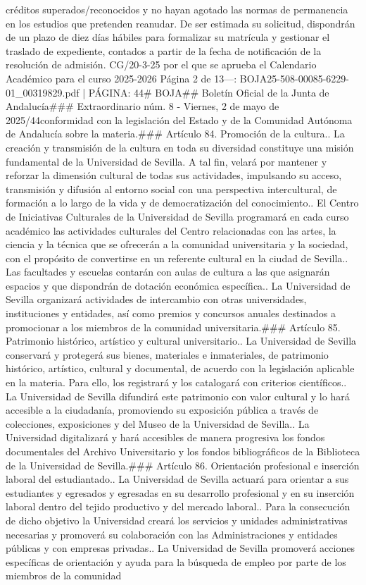 \documentclass{article}
\begin{document}
\begin{itemize}
{créditos superados/reconocidos y no hayan agotado las normas de permanencia en los estudios que pretenden reanudar. De ser estimada su solicitud, dispondrán de un plazo de diez días hábiles para formalizar su matrícula y gestionar el traslado de expediente, contados a partir de la fecha de notificación de la resolución de admisión.\n{} CG/20-3-25 por el que se aprueba el Calendario Académico para el curso 2025-2026  Página 2 de 13\n\n---\n\nFUENTE: BOJA25-508-00085-6229-01_00319829.pdf | PÁGINA: 44\n# BOJA\n## Boletín Oficial de la Junta de Andalucía\n### Extraordinario núm. 8 - Viernes, 2 de mayo de 2025/44\n\nde conformidad con la legislación del Estado y de la Comunidad Autónoma de Andalucía sobre la materia.\n\n### Artículo 84. Promoción de la cultura.. La creación y transmisión de la cultura en toda su diversidad constituye una misión fundamental de la Universidad de Sevilla. A tal fin, velará por mantener y reforzar la dimensión cultural de todas sus actividades, impulsando su acceso, transmisión y difusión al entorno social con una perspectiva intercultural, de formación a lo largo de la vida y de democratización del conocimiento.. El Centro de Iniciativas Culturales de la Universidad de Sevilla programará en cada curso académico las actividades culturales del Centro relacionadas con las artes, la ciencia y la técnica que se ofrecerán a la comunidad universitaria y la sociedad, con el propósito de convertirse en un referente cultural en la ciudad de Sevilla.. Las facultades y escuelas contarán con aulas de cultura a las que asignarán espacios y que dispondrán de dotación económica específica.. La Universidad de Sevilla organizará actividades de intercambio con otras universidades, instituciones y entidades, así como premios y concursos anuales destinados a promocionar a los miembros de la comunidad universitaria.\n\n### Artículo 85. Patrimonio histórico, artístico y cultural universitario.. La Universidad de Sevilla conservará y protegerá sus bienes, materiales e inmateriales, de patrimonio histórico, artístico, cultural y documental, de acuerdo con la legislación aplicable en la materia. Para ello, los registrará y los catalogará con criterios científicos.. La Universidad de Sevilla difundirá este patrimonio con valor cultural y lo hará accesible a la ciudadanía, promoviendo su exposición pública a través de colecciones, exposiciones y del Museo de la Universidad de Sevilla.. La Universidad digitalizará y hará accesibles de manera progresiva los fondos documentales del Archivo Universitario y los fondos bibliográficos de la Biblioteca de la Universidad de Sevilla.\n\n### Artículo 86. Orientación profesional e inserción laboral del estudiantado.. La Universidad de Sevilla actuará para orientar a sus estudiantes y egresados y egresadas en su desarrollo profesional y en su inserción laboral dentro del tejido productivo y del mercado laboral.. Para la consecución de dicho objetivo la Universidad creará los servicios y unidades administrativas necesarias y promoverá su colaboración con las Administraciones y entidades públicas y con empresas privadas.. La Universidad de Sevilla promoverá acciones específicas de orientación y ayuda para la búsqueda de empleo por parte de los miembros de la comunidad }
\end{itemize}
\end{document}
